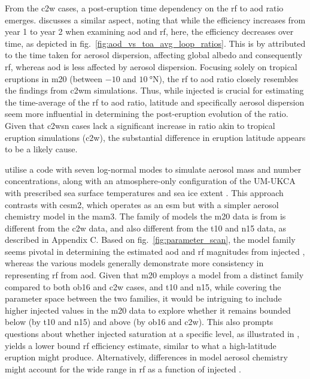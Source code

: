 \documentclass{ametsocV6.1}
\newcommand{\iso}[1][i]{{#1}njected \ce{SO2}}
\begin{document}
From the \gls{c2w} cases, a post-eruption time dependency on the \gls{rf} to
\gls{aod} ratio emerges. \citet{marshall2020} discusses a similar aspect, noting that
while the efficiency increases from year 1 to year 2 when examining \gls{aod} and
\gls{rf}, here, the efficiency decreases over time, as depicted in
fig.~\ref{fig:aod_vs_toa_avg_loop_ratios}. This is by \citet{marshall2020} attributed to
the time taken for aerosol dispersion, affecting global albedo and consequently
\gls{rf}, whereas \gls{aod} is less affected by aerosol dispersion. Focusing solely on
tropical eruptions in \gls{m20} (between \(-10\) and \(\SI{10}{\degree\mathrm{N}}\)),
the \gls{rf} to \gls{aod} ratio closely resembles the findings from \gls{c2wm}
simulations. Thus, while \iso{} is crucial for estimating the time-average of the
\gls{rf} to \gls{aod} ratio, latitude and specifically aerosol dispersion seem more
influential in determining the post-eruption evolution of the ratio. Given that
\gls{c2wsn} cases lack a significant increase in ratio akin to tropical eruption
simulations (\gls{c2w}), the substantial difference in eruption latitude appears to be a
likely cause.

\citet{marshall2019, marshall2020, marshall2021} utilise a code with seven log-normal
modes to simulate aerosol mass and number concentrations, along with an atmosphere-only
configuration of the UM-UKCA with prescribed sea surface temperatures and sea ice extent
\citep{marshall2019}. This approach contrasts with \gls{cesm2}, which operates as an
\gls{esm} but with a simpler aerosol chemistry model in the \gls{mam3}. The family of
models the \gls{m20} data is from is different from the \gls{c2w} data, and also
different from the \gls{t10} and \gls{n15} data, as described in Appendix C. Based on
fig.~\ref{fig:parameter_scan}, the model family seems pivotal in determining the
estimated \gls{aod} and \gls{rf} magnitudes from \iso{}, whereas the various models
generally demonstrate more consistency in representing \gls{rf} from \gls{aod}. Given
that \gls{m20} employs a model from a distinct family compared to both \gls{ob16} and
\gls{c2w} cases, and \gls{t10} and \gls{n15}, while covering the parameter space between
the two families, it would be intriguing to include higher \iso{} values in the
\gls{m20} data to explore whether it remains bounded below (by \gls{t10} and \gls{n15})
and above (by \gls{ob16} and \gls{c2w}). This also prompts questions about whether
\iso{} saturation at a specific level, as illustrated in \citet{niemeier2015}, yields a
lower bound \gls{rf} efficiency estimate, similar to what a high-latitude eruption might
produce. Alternatively, differences in model aerosol chemistry might account for the
wide range in \gls{rf} as a function of \iso{}.
\end{document}
